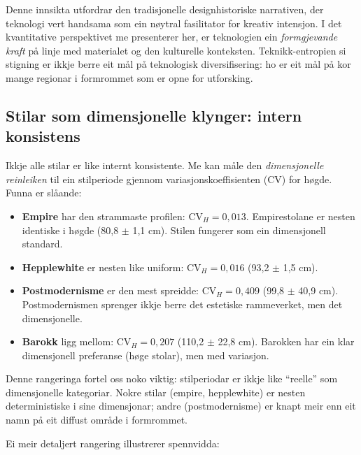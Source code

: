 \documentclass[10pt, a4paper, twocolumn]{article}
\begin{document}
Denne innsikta utfordrar den tradisjonelle designhistoriske narrativen, der teknologi vert handsama som ein nøytral fasilitator for kreativ intensjon. I det kvantitative perspektivet me presenterer her, er teknologien ein \emph{formgjevande kraft} på linje med materialet og den kulturelle konteksten. Teknikk-entropien si stigning er ikkje berre eit mål på teknologisk diversifisering: ho er eit mål på kor mange regionar i formrommet som er opne for utforsking.

\subsection{Stilar som dimensjonelle klynger: intern konsistens}

Ikkje alle stilar er like internt konsistente. Me kan måle den \emph{dimensjonelle reinleiken} til ein stilperiode gjennom variasjonskoeffisienten (CV) for høgde. Funna er slåande:

\begin{itemize}
  \item \textbf{Empire} har den strammaste profilen: $\text{CV}_H = 0{,}013$. Empirestolane er nesten identiske i høgde (80,8 $\pm$ 1,1 cm). Stilen fungerer som ein dimensjonell standard.
  \item \textbf{Hepplewhite} er nesten like uniform: $\text{CV}_H = 0{,}016$ (93,2 $\pm$ 1,5 cm).
  \item \textbf{Postmodernisme} er den mest spreidde: $\text{CV}_H = 0{,}409$ (99,8 $\pm$ 40,9 cm). Postmodernismen sprenger ikkje berre det estetiske rammeverket, men det dimensjonelle.
  \item \textbf{Barokk} ligg mellom: $\text{CV}_H = 0{,}207$ (110,2 $\pm$ 22,8 cm). Barokken har ein klar dimensjonell preferanse (høge stolar), men med variasjon.
\end{itemize}

Denne rangeringa fortel oss noko viktig: stilperiodar er ikkje like ``reelle'' som dimensjonelle kategoriar. Nokre stilar (empire, hepplewhite) er nesten deterministiske i sine dimensjonar; andre (postmodernisme) er knapt meir enn eit namn på eit diffust område i formrommet.

Ei meir detaljert rangering illustrerer spennvidda:
\end{document}
